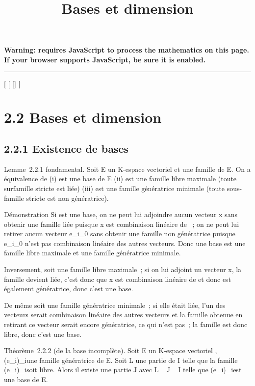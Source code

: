 \documentclass[]{article}
\title{Bases et dimension}
\author{}
\date{}
\begin{document}
\maketitle

\textbf{Warning: 
requires JavaScript to process the mathematics on this page.\\ If your
browser supports JavaScript, be sure it is enabled.}

\begin{center}\rule{3in}{0.4pt}\end{center}

[
[
[]
[

\section{2.2 Bases et dimension}

\subsection{2.2.1 Existence de bases}

Lemme~2.2.1 fondamental. Soit E un K-espace vectoriel et  une famille
de E. On a équivalence de (i)  est une base de E (ii)  est une famille
libre maximale (toute surfamille stricte est liée) (iii)  est une
famille génératrice minimale (toute sous-famille stricte est non
génératrice).

Démonstration Si  est une base, on ne peut lui adjoindre aucun vecteur
x sans obtenir une famille liée puisque x est combinaison linéaire de
~; on ne peut lui retirer aucun vecteur e_i_0 sans
obtenir une famille non génératrice puisque e_i_0
n'est pas combinaison linéaire des autres vecteurs. Donc une base est
une famille libre maximale et une famille génératrice minimale.

Inversement, soit  une famille libre maximale~; si on lui adjoint un
vecteur x, la famille devient liée, c'est donc que x est combinaison
linéaire de  et donc  est également génératrice, donc c'est une base.

De même soit  une famille génératrice minimale~; si elle était liée,
l'un des vecteurs serait combinaison linéaire des autres vecteurs et la
famille obtenue en retirant ce vecteur serait encore génératrice, ce qui
n'est pas~; la famille est donc libre, donc c'est une base.

Théorème~2.2.2 (de la base incomplète). Soit E un K-espace vectoriel ,
(e_i)_i\inI une famille génératrice de E. Soit L une
partie de I telle que la famille (e_i)_i\inL soit libre.
Alors il existe une partie J avec L \subset~ J \subset~ I telle que
(e_i)_i\inJ est une base de E.
\end{document}
